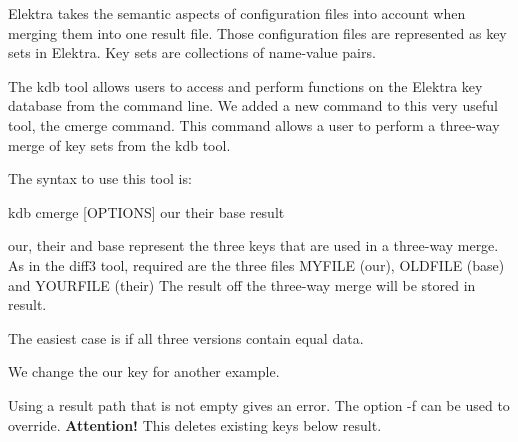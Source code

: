 Elektra takes the semantic aspects of configuration files into account when merging them into one result file. Those configuration files are represented as key sets in Elektra. Key sets are collections of name-\/value pairs.

The {\ttfamily kdb} tool allows users to access and perform functions on the Elektra key database from the command line. We added a new command to this very useful tool, the {\ttfamily cmerge} command. This command allows a user to perform a three-\/way merge of key sets from the {\ttfamily kdb} tool.

The syntax to use this tool is\+:

{\ttfamily kdb cmerge \mbox{[}O\+P\+T\+I\+O\+NS\mbox{]} our their base result}

{\ttfamily our}, {\ttfamily their} and {\ttfamily base} represent the three keys that are used in a three-\/way merge. As in the {\ttfamily diff3} tool, required are the three files M\+Y\+F\+I\+LE (our), O\+L\+D\+F\+I\+LE (base) and Y\+O\+U\+R\+F\+I\+LE (their) The result off the three-\/way merge will be stored in {\ttfamily result}.

The easiest case is if all three versions contain equal data.


\begin{DoxyCode}{0}
\end{DoxyCode}


We change the our key for another example.


\begin{DoxyCode}{0}
\end{DoxyCode}


Using a {\ttfamily result} path that is not empty gives an error. The option {\ttfamily -\/f} can be used to override. {\bfseries{Attention!}} This deletes existing keys below {\ttfamily result}.


\begin{DoxyCode}{0}
\end{DoxyCode}


